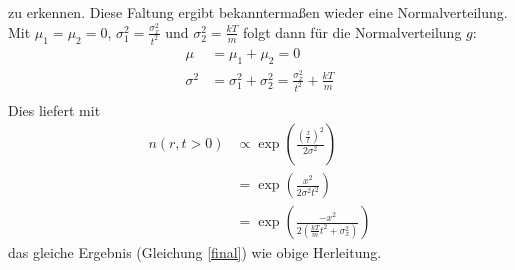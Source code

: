 \documentclass[10pt,a4paper]{extarticle}
\begin{document}
zu erkennen.
Diese Faltung ergibt bekanntermaßen wieder eine Normalverteilung.
Mit $\mu_1 = \mu_2 = 0$, $\sigma_1^2 = \frac{\sigma_x^2}{t^2}$ und $\sigma_2^2 = \frac{kT}{m}$ folgt dann für die Normalverteilung $g$:
\begin{align}
\mu &= \mu_1 + \mu_2 = 0 \\
\sigma^2 &= \sigma_1^2 + \sigma_2^2 =  \frac{\sigma_x^2}{t^2} + \frac{kT}{m}\\
\end{align}
Dies liefert mit 
\begin{align}
n(r, t> 0) &\varpropto \exp\left(\frac{\left(\frac{x}{t}\right)^2}{2 \sigma^2}\right) \\
&= \exp\left(\frac{x^2}{2 \sigma^2 t^2}\right) \\
&= \exp\left(\frac{- x^2 }{2\left(\frac{kT}{m}t^2 + \sigma_x^2\right)}\right) 
\end{align}
das gleiche Ergebnis (Gleichung \eqref{final}) wie obige Herleitung.
\end{document}

